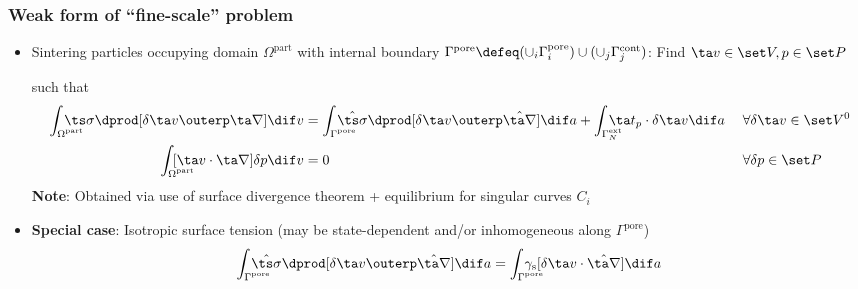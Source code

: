 \documentclass[11pt]{beamer} %
\newcommand{\pore}{\mathrm{pore}}
\newcommand{\particle}{\mathrm{part}}
\newcommand{\surf}{\mathrm{s}}
\newcommand{\contact}{\mathrm{cont}}
\newcommand{\external}{\mathrm{ext}}
\renewcommand{\alert}[1]{\textbf{#1}}
\begin{document}
\begin{frame}
 \frametitle{Weak form of ``fine-scale'' problem}
 \begin{itemize}
  \item Sintering particles occupying domain $\Omega^\particle$ with internal boundary $\Gamma^\pore \defeq (\cup_i \Gamma_i^\pore) \cup (\cup_j \Gamma_j^\contact)$:
Find $\ta v\in \set V, p\in \set P$

 such that
\begin{align*}
  \int_{\mathrlap{\Omega^\particle}} \;\ts\sigma\dprod[\delta\ta v\outerp\ta\nabla]\dif v &=
   \int_{\mathrlap{\Gamma^\pore}} \;\hat{\ts\sigma}\dprod[\delta\ta v\outerp\hat{\ta\nabla}] \dif a +
   \int_{\mathrlap{\Gamma_N^\external}} \;\ta t_p\cdot\delta\ta v\dif a \; && \forall \delta \ta v\in \set V^0 \\
  \int_{\mathrlap{\Omega^\particle}} \;[\ta v\cdot\ta\nabla]\delta p\dif v &= 0 && \forall \delta p\in \set P
\end{align*}
\alert{Note}: Obtained via use of surface divergence theorem + equilibrium for singular curves $C_i$

 \item \alert{Special case}: Isotropic surface tension (may be state-dependent and/or inhomogeneous along $\Gamma^\pore$)
 \begin{align*}
  \int_{\mathrlap{\Gamma^\pore}} \;\hat{\ts\sigma}\dprod[\delta\ta v\outerp\hat{\ta\nabla}] \dif a =
  \int_{\mathrlap{\Gamma^\pore}} \;\gamma_\surf[\delta\ta v\cdot\hat{\ta\nabla}] \dif a
 \end{align*}

 \end{itemize}

\end{frame}
\end{document}
